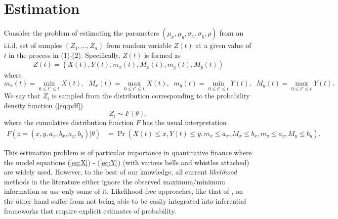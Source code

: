 

\section{Estimation}
Consider the problem of estimating the parameters
$(\mu_x, \mu_y, \sigma_x, \sigma_y, \rho)$ from an i.i.d. set of
samples $(Z_1, \ldots, Z_n)$ from random variable $Z(t)$ at a given
value of $t$ in the process in (1)-(2). Specifically, $Z(t)$ is formed
as
$$ Z(t) =( X(t), Y(t), m_x(t), M_x(t), m_y(t), M_y(t)) $$
where 
$$m_x(t)= \min_{0 \le t' \le t} X(t), \;\; 
M_x(t)= \max_{0 \le t' \le t} X(t), \;\; m_y(t)= \min_{0 \le t' \le t}
Y(t), \;\; M_y(t)= \max_{0 \le t' \le t} Y(t). $$ We say that $Z_i$ is
sampled from the distribution corresponding to the probability density
function (\ref{eq:pdf})
\[
  Z_i \sim F(\theta),
\]
where the cumulative distribution function $F$ has the usual interpretation
\begin{align*}
  F(z = (x, y, a_x, b_x, a_y, b_y) | \theta) &= \Pr\left(X(t) \leq x,
    Y(t) \leq y, m_x \leq a_x, M_x \leq b_x, m_y \leq a_y, M_y \leq b_y\right).
\end{align*}

This estimation problem is of particular importance in quantitative
finance where the model equations (\ref{eq:X}) - (\ref{eq:Y}) (with
various bells and whistles attached) are widely used. However, to the
best of our knowledge, all current \textit{likelihood} methods in the
literature either ignore the observed maximum/minimum information or
use only some of it. Likelihood-free approaches, like that of
\cite{rogers1991estimating}, on the other hand suffer from not being
able to be easily integrated into inferential frameworks that require
explicit estimates of probability.

